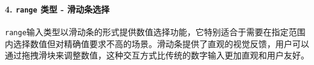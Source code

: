 \begin{Shaded}
\begin{Highlighting}[]
\DataTypeTok{\textless{}}\OperatorTok{=}\DataTypeTok{\textgreater{}}\DataTypeTok{\textless{}/}\DataTypeTok{\textgreater{}}
\DataTypeTok{\textless{}}\OperatorTok{=}\OtherTok{ }
\OperatorTok{=}\OtherTok{ }
\OperatorTok{=}\OtherTok{ }
\OperatorTok{=}\OtherTok{ }
\OperatorTok{=}\OtherTok{ }
\OperatorTok{=}\OtherTok{ }
\OperatorTok{=}
\DataTypeTok{\textgreater{}}

\DataTypeTok{\textless{}}\OperatorTok{=}\DataTypeTok{\textgreater{}}\DataTypeTok{\textless{}/}\DataTypeTok{\textgreater{}}
\DataTypeTok{\textless{}}\OperatorTok{=}\OtherTok{ }
\OperatorTok{=}\OtherTok{ }
\OperatorTok{=}\OtherTok{ }
\OperatorTok{=}\OtherTok{ }
\OperatorTok{=}\OtherTok{ }
\OperatorTok{=}
\OperatorTok{=}\DataTypeTok{\textgreater{}}
\end{Highlighting}
\end{Shaded}

\paragraph{\texorpdfstring{4. \texttt{range} 类型 - 滑动条选择}{4. range 类型 - 滑动条选择}}\label{range-ux7c7bux578b---ux6ed1ux52a8ux6761ux9009ux62e9}

\texttt{range}输入类型以滑动条的形式提供数值选择功能，它特别适合于需要在指定范围内选择数值但对精确值要求不高的场景。滑动条提供了直观的视觉反馈，用户可以通过拖拽滑块来调整数值，这种交互方式比传统的数字输入更加直观和用户友好。

